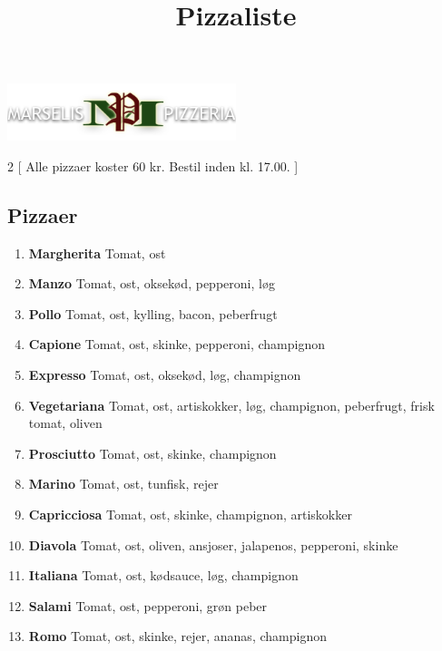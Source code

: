 \documentclass[danish,a4paper]{article}
\title{Pizzaliste}
\date{\vspace{-10ex}}
\author{\vspace{-10ex}}
\begin{document}

\maketitle

\begin{center}
    \includegraphics[width=0.5\textwidth]{logo.png}
\end{center}

\begin{multicols}{2}
[
\noindent Alle pizzaer koster 60 kr. Bestil inden kl. 17.00.
]
\subsection*{Pizzaer}
\begin{enumerate}[label={\large\textbf{\arabic*}.}]
    \setcounter{enumi}{0}
    \item \textbf{\textcolor{vegigreen}{Margherita}} Tomat, ost
    \item \textbf{Manzo} Tomat, ost, oksekød, pepperoni, løg
    \item \textbf{Pollo} Tomat, ost, kylling, bacon, peberfrugt 
    \item \textbf{Capione} Tomat, ost, skinke, pepperoni, champignon
    \item \textbf{Expresso} Tomat, ost, oksekød, løg, champignon 
    \item \textbf{\textcolor{vegigreen}{Vegetariana}} Tomat, ost, artiskokker, løg, champignon, peberfrugt, frisk tomat, oliven
    \item \textbf{Prosciutto} Tomat, ost, skinke, champignon 
    \item \textbf{Marino} Tomat, ost, tunfisk, rejer
    \item \textbf{Capricciosa} Tomat, ost, skinke, champignon, artiskokker
    \item \textbf{Diavola} Tomat, ost, oliven, ansjoser, jalapenos, pepperoni, skinke
    \item \textbf{Italiana} Tomat, ost, kødsauce, løg, champignon 
    \item \textbf{Salami} Tomat, ost, pepperoni, grøn peber
    \item \textbf{Romo} Tomat, ost, skinke, rejer, ananas, champignon

\end{enumerate}
\end{multicols}
\end{document}

